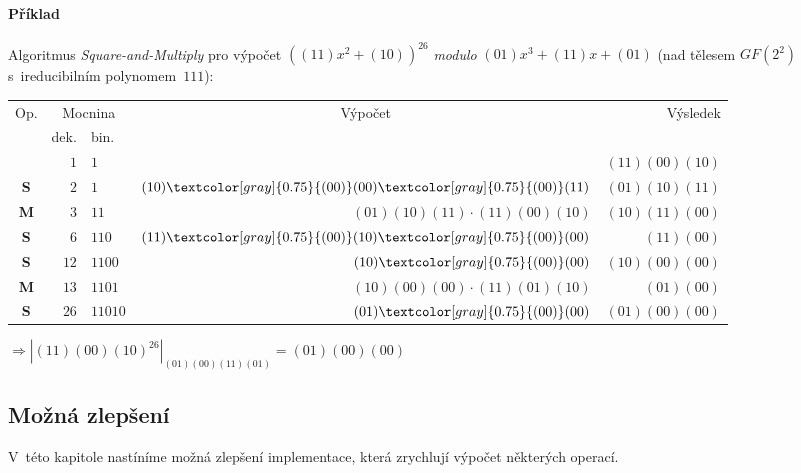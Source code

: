 \documentclass[thesis=M,czech,hidelinks]{FITthesis}[2012/06/26]
\newcommand{\0}{{\textcolor[gray]{0.75}{0}}}
\begin{document}
\paragraph{Příklad} Algoritmus \emph{Square-and-Multiply} pro výpočet
$\left( (11)x^2 + (10) \right)^{26}$ \emph{modulo} $(01)x^3 + (11)x + (01)$
(nad tělesem $GF(2^2)$ s~ireducibilním polynomem~$111$):

\renewcommand{\0}{{\textcolor[gray]{0.75}{(00)}}}
\begin{center}
    \begin{tabular}{c|r|l|r|r}
        \multirow{2}{*}{Op.} & \multicolumn{2}{c}{Mocnina} & \multicolumn{1}{c}{\multirow{2}{*}{Výpočet}} & \multirow{2}{*}{Výsledek} \\
                &  dek. & bin.    &                                     &                \\
        \hline
        \hline
                & $  1$ & $1    $ &                                     & $(11)(00)(10)$ \\
        \hline
    \textbf{S}  & $  2$ & $1    $ & $                (10)\0(00)\0(11) $ & $(01)(10)(11)$ \\
    \textbf{M}  & $  3$ & $11   $ & $ (01)(10)(11) \cdot (11)(00)(10) $ & $(10)(11)(00)$ \\
        \hline
    \textbf{S}  & $  6$ & $110  $ & $                (11)\0(10)\0(00) $ & $    (11)(00)$ \\
        \hline
    \textbf{S}  & $ 12$ & $1100 $ & $                      (10)\0(00) $ & $(10)(00)(00)$ \\
    \textbf{M}  & $ 13$ & $1101 $ & $ (10)(00)(00) \cdot (11)(01)(10) $ & $    (01)(00)$ \\
        \hline
    \textbf{S}  & $ 26$ & $11010$ & $                      (01)\0(00) $ & $(01)(00)(00)$ \\
    \end{tabular}
\end{center}
$
    \Rightarrow
    \left| (11)(00)(10)^{26} \right|_{(01)(00)(11)(01)} = (01)(00)(00)
$


\subsection{Možná zlepšení}\label{kap_telesa_zlepseni}

V~této kapitole nastíníme možná zlepšení implementace, která zrychlují
výpočet některých operací.
\end{document}
